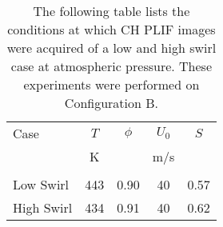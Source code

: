 \begin{table}
  \caption[Test conditions for studying swirl effects]{The following table lists the conditions at which CH PLIF images were acquired of a low and high swirl case at atmospheric pressure. These experiments were performed on Configuration B.}
  \begin{center}
    \begin{tabular}{lcccc}
      Case & \(T\) & \(\phi\) & \(U_0\) & \(S\) \tabularnewline
      & K & & m/s & \tabularnewline
      \hline\hline
      & & & & \tabularnewline
      Low Swirl & 443 & 0.90 & 40 & 0.57 \tabularnewline
      High Swirl & 434 & 0.91 & 40 & 0.62 \tabularnewline
      \hline
    \end{tabular}
  \end{center}
  \label{tab:swirlCases}
\end{table}

